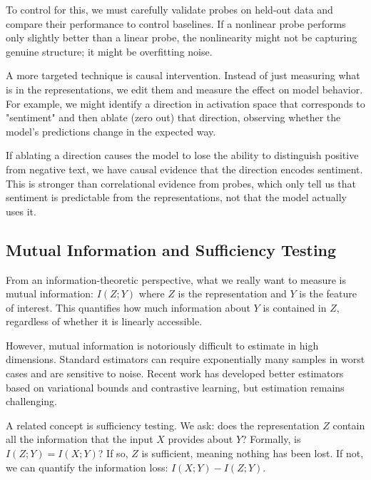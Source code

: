 To control for this, we must carefully validate probes on held-out data and compare their performance to control baselines. If a nonlinear probe performs only slightly better than a linear probe, the nonlinearity might not be capturing genuine structure; it might be overfitting noise.

\vspace{1em}

A more targeted technique is causal intervention. Instead of just measuring what is in the representations, we edit them and measure the effect on model behavior. For example, we might identify a direction in activation space that corresponds to "sentiment" and then ablate (zero out) that direction, observing whether the model's predictions change in the expected way.

If ablating a direction causes the model to lose the ability to distinguish positive from negative text, we have causal evidence that the direction encodes sentiment. This is stronger than correlational evidence from probes, which only tell us that sentiment is predictable from the representations, not that the model actually uses it.

\vspace{1.5em}

\subsection{Mutual Information and Sufficiency Testing}

From an information-theoretic perspective, what we really want to measure is mutual information: $I(Z; Y)$ where $Z$ is the representation and $Y$ is the feature of interest. This quantifies how much information about $Y$ is contained in $Z$, regardless of whether it is linearly accessible.

However, mutual information is notoriously difficult to estimate in high dimensions. Standard estimators can require exponentially many samples in worst cases and are sensitive to noise. Recent work has developed better estimators based on variational bounds and contrastive learning, but estimation remains challenging.

A related concept is sufficiency testing. We ask: does the representation $Z$ contain all the information that the input $X$ provides about $Y$? Formally, is $I(Z; Y) = I(X; Y)$? If so, $Z$ is sufficient, meaning nothing has been lost. If not, we can quantify the information loss: $I(X; Y) - I(Z; Y)$.

